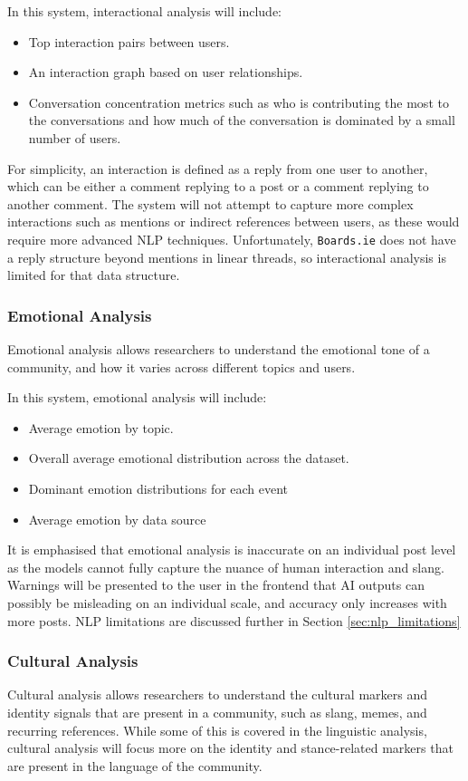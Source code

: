 \documentclass[12pt, a4paper]{article}
\begin{document}
In this system, interactional analysis will include:
\begin{itemize}
    \item Top interaction pairs between users.
    \item An interaction graph based on user relationships.
    \item Conversation concentration metrics such as who is contributing the most to the conversations and how much of the conversation is dominated by a small number of users.
\end{itemize}

For simplicity, an interaction is defined as a reply from one user to another, which can be either a comment replying to a post or a comment replying to another comment. The system will not attempt to capture more complex interactions such as mentions or indirect references between users, as these would require more advanced NLP techniques. Unfortunately, \texttt{Boards.ie} does not have a reply structure beyond mentions in linear threads, so interactional analysis is limited for that data structure.

\subsubsection{Emotional Analysis}
Emotional analysis allows researchers to understand the emotional tone of a community, and how it varies across different topics and users.

In this system, emotional analysis will include:
\begin{itemize}
    \item Average emotion by topic.
    \item Overall average emotional distribution across the dataset.
    \item Dominant emotion distributions for each event
    \item Average emotion by data source
\end{itemize}

It is emphasised that emotional analysis is inaccurate on an individual post level as the models cannot fully capture the nuance of human interaction and slang. Warnings will be presented to the user in the frontend that AI outputs can possibly be misleading on an individual scale, and accuracy only increases with more posts. NLP limitations are discussed further in Section \ref{sec:nlp_limitations}

\subsubsection{Cultural Analysis}
Cultural analysis allows researchers to understand the cultural markers and identity signals that are present in a community, such as slang, memes, and recurring references. While some of this is covered in the linguistic analysis, cultural analysis will focus more on the identity and stance-related markers that are present in the language of the community.
\end{document}

